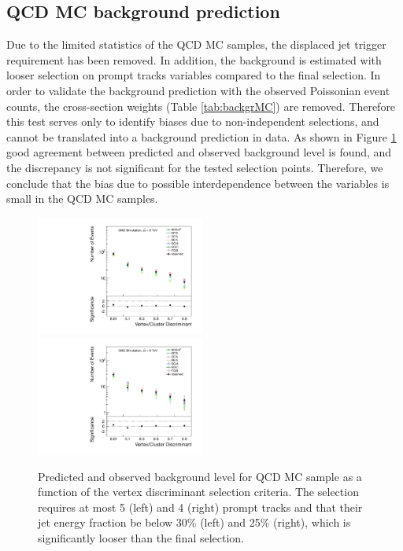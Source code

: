 \subsection{QCD MC background prediction}
\label{subsec:bkgQCDMC}

Due to the limited statistics of the QCD MC samples, the displaced jet trigger requirement has been removed. In addition, the background is estimated with looser
 selection on prompt tracks variables compared to the final selection. 
In order to validate the background prediction with 
the observed Poissonian event counts, the cross-section weights (Table \ref{tab:backgrMC}) 
are removed. 
Therefore this test serves only to identify biases due to non-independent selections,
and cannot be translated
into a background prediction in data.  
As shown in Figure \ref{fig:bkg_MC} good agreement between predicted and observed background level is found, 
and the discrepancy is not significant for the tested selection points. Therefore, we conclude that the  
bias due to possible interdependence between the variables is small in the QCD MC samples. 

\begin{figure}[htbp]
  \centering
  \includegraphics[width=0.495\textwidth]{plots/background/bkg_MC1.pdf}
  \includegraphics[width=0.495\textwidth]{plots/background/bkg_MC2.pdf}
  \caption{Predicted and observed background level for QCD MC sample as a function of the vertex discriminant selection criteria.
The selection requires at most 5 (left) and 4 (right)  prompt tracks and that their jet energy fraction be below 30\% (left) and 25\% (right), which
is significantly looser than the final selection. \label{fig:bkg_MC}}
  \end{figure}


